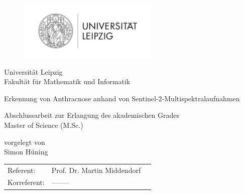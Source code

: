 \pagestyle{empty} %

\begin{figure}[t]
	\centering
	\includegraphics[width=0.6\textwidth]{pics/logo_uni_leipzig}
\end{figure}


\begin{center}
\Large Universität Leipzig \\
\normalsize Fakultät für Mathematik und Informatik\\

\vspace{105 pt}

\Huge Erkennung von Anthracnose anhand von Sentinel-2-Multispektralaufnahmen \\ 
\normalsize
\vspace{20 pt}

Abschlussarbeit zur Erlangung des akademischen Grades \\ 
Master of Science (M.Sc.) 

\vspace{75 pt}


vorgelegt von \\
\vspace{5 pt}
Simon Hüning 
\vspace{115 pt}

\begin{tabular}[h]{p{4cm}l l}
	Referent: & Prof. Dr. Martin Middendorf\\
	Korreferent: & --------
\end{tabular}


\end{center}